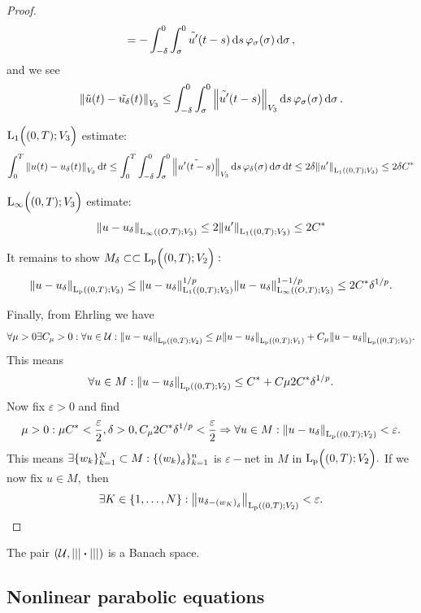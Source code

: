 \documentclass{article}
\begin{document}
\begin{proof}
	\[
		= - \int_{-\delta}^0 \int_{\sigma}^0 \tilde{u'}\qty(t-s)\dd{s}\varphi_{\sigma}\qty(\sigma)\dd{\sigma},
	\]
	and we see
	\[
		\norm{\tilde{u}(t)-\tilde{u_{\delta}}(t)}_{V_3} \leq \int_{-\delta}^0 \int_{\sigma}^0 \norm{\tilde{u'}\qty(t-s)}_{V_3}\dd{s}\varphi_{\sigma}\qty(\sigma)\dd{\sigma}.
	\]


	$\text{L}_{\text{1}}\!\,\Bigl( (0,T);V_3 \Bigr)$ estimate:
	\[
		\int_{0}^T \norm{u(t)-u_{\delta}(t)}_{V_3}\dd{t} \leq \int_{0}^T \int_{-\delta}^0 \int_{\sigma}^0 \norm{\tilde{u'(t-s)}}_{V_3}\dd{s}\varphi_{\delta}\qty(\sigma)\dd{\sigma}\dd{t} \leq 2 \delta \norm{u'}_{\text{L}_{\text{1}}\!\,\left( (0,T);V_3 \right)} \leq 2 \delta C^{*}
	\]


	$\text{L}_{\infty}\!\,\Bigl( (0,T);V_3 \Bigr)$ estimate:
	\[
		\norm{u-u_{\delta}}_{\text{L}_{\infty}\!\,\left( (O,T);V_3 \right)}\leq 2 \norm{u'}_{\text{L}_{\text{1}}\!\,\left( (0,T);V_3 \right)} \leq 2 C^{*}
	\]


	It remains to show $M_{\delta} \subset \subset \text{L}_{\text{p}}\!\,\Bigl( (0,T);V_2 \Bigr):$
	\[
		\norm{u-u_{\delta}}_{\text{L}_{\text{p}}\!\,\left( (0,T);V_3 \right)}\leq \norm{u-u_{\delta}}_{\text{L}_{\text{1}}\!\,\left( (0,T);V_3 \right)}^{1/p} \norm{u-u_{\delta}}_{\text{L}_{\infty}\!\,\left( (O,T);V_3 \right)}^{1-1/p} \leq 2 C^{*} \delta^{1/p}.
	\]

	Finally, from Ehrling we have
	\[
		\forall \mu >0 \exists C_{\mu}>0: \forall u \in \mathcal{U}: \norm{u-u_{\delta}}_{\text{L}_{\text{p}}\!\,\left( (0,T);V_2 \right)}\leq \mu \norm{u-u_{\delta}}_{\text{L}_{\text{p}}\!\,\left( (0,T);V_1 \right)}+ C_{\mu}\norm{u-u_{\delta}}_{\text{L}_{\text{p}}\!\,\left( (0,T);V_3 \right)}.
	\]
	This means
	\[
		\forall u \in M: \norm{u-u_{\delta}}_{\text{L}_{\text{p}}\!\,\left( (0,T);V_2 \right)}\leq C^{*} + C \mu 2 C^{*} \delta^{1/p}.
	\]
	Now fix $\varepsilon > 0$ and find
	\[
		\mu >0: \mu C^{*} < \frac{\varepsilon}{2}, \delta >0, C_{\mu}2 C^{*} \delta^{1/p} < \frac{\varepsilon}{2} \Rightarrow \forall u \in M: \norm{u-u_{\delta}}_{\text{L}_{\text{p}}\!\,\left( (0,T);V_2 \right)}< \varepsilon.
	\]
	This means $\exists \{ w_k \}_{k=1}^N \subset M: \{\qty(w_k)_{\delta}\}_{k=1}^n	$ is $\varepsilon-$net in $M$ in $\text{L}_{\text{p}}\!\,\Bigl( (0,T);V_2 \Bigr).$ If we now fix $u \in M,$ then
	\[
		\exists K \in \{1, \dots, N\}: \norm{u_{\delta-\qty(w_K)_{\delta}}}_{\text{L}_{\text{p}}\!\,\left( (0,T);V_2 \right)} < \varepsilon.
	\]
\end{proof}
\begin{remark}
	The pair $\qty(\mathcal{U}, |||\vdot|||)$ is a Banach space.
\end{remark}

\subsection{Nonlinear parabolic equations}
\label{sec:nonlinear_parabolic}
\end{document}

